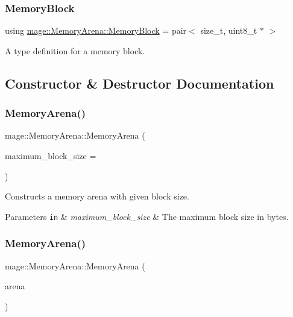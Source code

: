 \subsubsection{\texorpdfstring{Memory\+Block}{MemoryBlock}}
{\footnotesize\ttfamily using \hyperlink{classmage_1_1_memory_arena_af41064ba5e850e5541873b3c8acb5067}{mage\+::\+Memory\+Arena\+::\+Memory\+Block} =  pair$<$ size\+\_\+t, uint8\+\_\+t $\ast$ $>$\hspace{0.3cm}{\ttfamily [private]}}

A type definition for a memory block. 

\subsection{Constructor \& Destructor Documentation}
\hypertarget{classmage_1_1_memory_arena_a5182142d8ae2c7bc3eb1bae4f1a10d29}{}\label{classmage_1_1_memory_arena_a5182142d8ae2c7bc3eb1bae4f1a10d29} 
\subsubsection{\texorpdfstring{Memory\+Arena()}{MemoryArena()}\hspace{0.1cm}{\footnotesize\ttfamily [1/3]}}
{\footnotesize\ttfamily mage\+::\+Memory\+Arena\+::\+Memory\+Arena (\begin{DoxyParamCaption}\item[{size\+\_\+t}]{maximum\+\_\+block\+\_\+size = {} }\end{DoxyParamCaption})\hspace{0.3cm}{\ttfamily [explicit]}}

Constructs a memory arena with given block size.


\begin{DoxyParams}[1]{Parameters}
\mbox{\tt in}  & {\em maximum\+\_\+block\+\_\+size} & The maximum block size in bytes. \\
\hline
\end{DoxyParams}
\hypertarget{classmage_1_1_memory_arena_a1eca6fdacbd1226f4b21f443d118168b}{}\label{classmage_1_1_memory_arena_a1eca6fdacbd1226f4b21f443d118168b} 
\subsubsection{\texorpdfstring{Memory\+Arena()}{MemoryArena()}\hspace{0.1cm}{\footnotesize\ttfamily [2/3]}}
{\footnotesize\ttfamily mage\+::\+Memory\+Arena\+::\+Memory\+Arena (\begin{DoxyParamCaption}\item[{const \hyperlink{classmage_1_1_memory_arena}{Memory\+Arena} \&}]{arena }\end{DoxyParamCaption})\hspace{0.3cm}{\ttfamily [delete]}}

